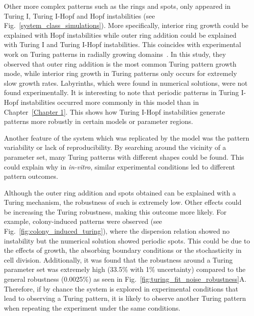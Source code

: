 Other more complex patterns such as the rings and spots, only appeared in Turing I, Turing I-Hopf and Hopf instabilities (see Fig.~\ref{system_class_simulations}).
More specifically, interior ring growth could be explained with Hopf instabilities while outer ring addition could be explained with Turing I and Turing I-Hopf instabilities.
This coincides with experimental work on Turing patterns in radially growing domains~\parencite{Konow2019}.
In this study, they observed that outer ring addition is the most common Turing pattern growth mode, while interior ring growth in Turing patterns only occurs for extremely slow growth rates.
Labyrinths, which were found in numerical solutions, were not found experimentally.
It is interesting to note that periodic patterns in Turing I-Hopf instabilities occurred more commonly in this model than in Chapter~\ref{Chapter 1}.
This shows how Turing I-Hopf instabilities generate patterns more robustly in certain models or parameter regions.

Another feature of the system which was replicated by the model was the pattern variability or lack of reproducibility.
By searching around the vicinity of a parameter set, many Turing patterns with different shapes could be found.
This could explain why in \textit{in-vitro}, similar experimental conditions led to different pattern outcomes.

Although the outer ring addition and spots obtained can be explained with a Turing mechanism, the robustness of such is extremely low.
Other effects could be increasing the Turing robustness, making this outcome more likely.
For example, colony-induced patterns were observed (see Fig.~\ref{fig:colony_induced_turing}), where the dispersion relation showed no instability but the numerical solution showed periodic spots.
This could be due to the effects of growth, the absorbing boundary conditions or the stochasticity in cell division.
Additionally, it was found that the robustness around a Turing parameter set was extremely high (33.5\% with 1\% uncertainty) compared to the general robustness (0.0025\%) as seen in Fig.~\ref{fig:turing_fit_noise_robustness}A.
Therefore, if by chance the system is explored in experimental conditions that lead to observing a Turing pattern, it is likely to observe another Turing pattern when repeating the experiment under the same conditions.

